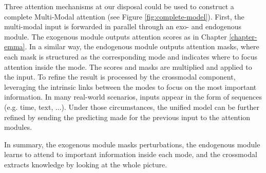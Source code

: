 Three attention mechanisms at our disposal could be used to construct a complete Multi-Modal attention (see Figure \ref{fig:complete-model}). First, the multi-modal input is forwarded in parallel through an exo- and endogenous module. The exogenous module outputs attention scores as in Chapter \ref{chapter-emma}. In a similar way, the endogenous module outputs attention masks, where each mask is structured as the corresponding mode and indicates where to focus attention inside the mode. The scores and masks are multiplied and applied to the input. To refine the result is processed by the crossmodal component, leveraging the intrinsic links between the modes to focus on the most important information. In many real-world scenarios, inputs appear in the form of sequences (e.g. time, text, ...). Under those circumstances, the unified model can be further refined by sending the predicting made for the previous input to the attention modules.

In summary, the exogenous module masks perturbations, the endogenous module learns to attend to important information inside each mode, and the crossmodal extracts knowledge by looking at the whole picture.



